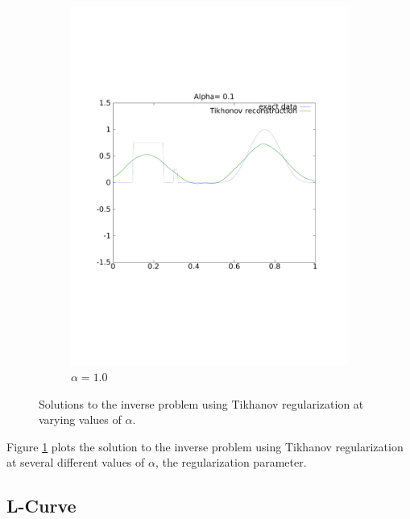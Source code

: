 \documentclass{article}
\begin{document}
\begin{figure}[!htb]
\begin{subfigure}[bh]{0.45\textwidth}
                \includegraphics[width=\textwidth]{plots/reconstruct1.pdf}
                \caption{$\alpha=1.0$}
        \end{subfigure}
        \caption{Solutions to the inverse problem using Tikhanov
 regularization at varying values of $\alpha$.} 
 \label{fig:tik}
\end{figure}

Figure \ref{fig:tik} plots the solution to the inverse problem using
Tikhanov regularization at several different values of $\alpha$, the
regularization parameter.  

\subsection{L-Curve}
\end{document}

